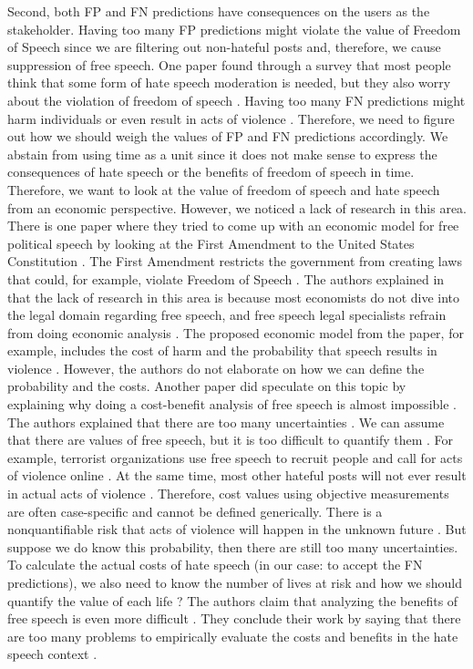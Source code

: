 Second, both FP and FN predictions have consequences on the users as the stakeholder. Having too many FP predictions might violate the value of Freedom of Speech since we are filtering out non-hateful posts and, therefore, we cause suppression of free speech. One paper found through a survey that most people think that some form of hate speech moderation is needed, but they also worry about the violation of freedom of speech \citep{olteanu2017limits}. Having too many FN predictions might harm individuals or even result in acts of violence \citep{ecri-hate-speech-and-violence}. Therefore, we need to figure out how we should weigh the values of FP and FN predictions accordingly. We abstain from using time as a unit since it does not make sense to express the consequences of hate speech or the benefits of freedom of speech in time. Therefore, we want to look at the value of freedom of speech and hate speech from an economic perspective. However, we noticed a lack of research in this area. There is one paper where they tried to come up with an economic model for free political speech by looking at the First Amendment to the United States Constitution \citep{posner1986free}. The First Amendment restricts the government from creating laws that could, for example, violate Freedom of Speech \citep{first-amendment-white-house}. The authors explained in \citet{posner1986free} that the lack of research in this area is because most economists do not dive into the legal domain regarding free speech, and free speech legal specialists refrain from doing economic analysis \citep{posner1986free}. The proposed economic model from the paper, for example, includes the cost of harm and the probability that speech results in violence \citep{posner1986free}. However, the authors do not elaborate on how we can define the probability and the costs. Another paper did speculate on this topic by explaining why doing a cost-benefit analysis of free speech is almost impossible \citep{sunstein2018does}. The authors explained that there are too many uncertainties \citep{sunstein2018does}. We can assume that there are values of free speech, but it is too difficult to quantify them \citep{sunstein2018does}. For example, terrorist organizations use free speech to recruit people and call for acts of violence online \citep{sunstein2018does}. At the same time, most other hateful posts will not ever result in actual acts of violence \citep{sunstein2018does}. Therefore, cost values using objective measurements are often case-specific and cannot be defined generically. There is a nonquantifiable risk that acts of violence will happen in the unknown future \citep{sunstein2018does}. But suppose we do know this probability, then there are still too many uncertainties. To calculate the actual costs of hate speech (in our case: to accept the FN predictions), we also need to know the number of lives at risk and how we should quantify the value of each life \citep{sunstein2018does}? The authors claim that analyzing the benefits of free speech is even more difficult \citep{sunstein2018does}. They conclude their work by saying that there are too many problems to empirically evaluate the costs and benefits in the hate speech context \citep{sunstein2018does}.

